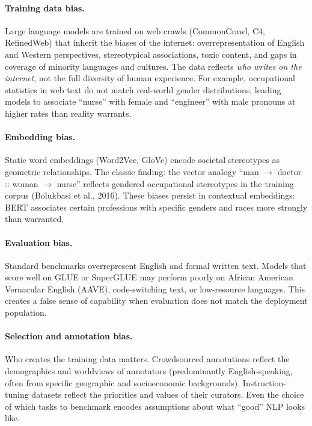 \paragraph{Training data bias.}
Large language models are trained on web crawls (CommonCrawl, C4, RefinedWeb)
that inherit the biases of the internet: overrepresentation of English and
Western perspectives, stereotypical associations, toxic content, and gaps in
coverage of minority languages and cultures.  The data reflects \emph{who writes
on the internet}, not the full diversity of human experience.  For example,
occupational statistics in web text do not match real-world gender distributions,
leading models to associate ``nurse'' with female and ``engineer'' with male
pronouns at higher rates than reality warrants.

\paragraph{Embedding bias.}
Static word embeddings (Word2Vec, GloVe) encode societal stereotypes as
geometric relationships.  The classic finding: the vector analogy
``man $\to$ doctor :: woman $\to$ nurse'' reflects gendered occupational
stereotypes in the training corpus (Bolukbasi et al., 2016).  These biases
persist in contextual embeddings: BERT associates certain professions with
specific genders and races more strongly than warranted.

\paragraph{Evaluation bias.}
Standard benchmarks overrepresent English and formal written text.  Models that
score well on GLUE or SuperGLUE may perform poorly on African American
Vernacular English (AAVE), code-switching text, or low-resource languages.
This creates a false sense of capability when evaluation does not match the
deployment population.

\paragraph{Selection and annotation bias.}
Who creates the training data matters.  Crowdsourced annotations reflect the
demographics and worldviews of annotators (predominantly English-speaking, often
from specific geographic and socioeconomic backgrounds).  Instruction-tuning
datasets reflect the priorities and values of their curators.  Even the choice
of which tasks to benchmark encodes assumptions about what ``good'' NLP looks
like.

